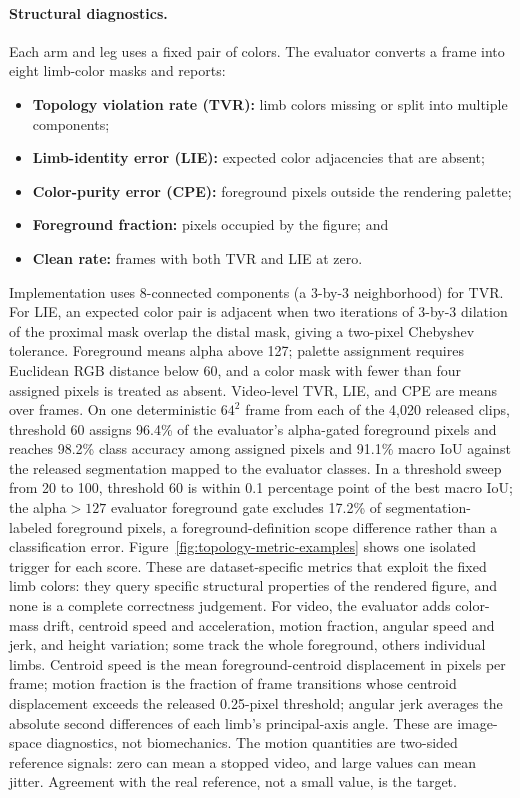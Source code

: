\documentclass[10pt,twocolumn,letterpaper]{article}
\begin{document}
\paragraph{Structural diagnostics.} Each arm and leg uses a fixed pair of colors. The evaluator converts a
frame into eight limb-color masks and reports:
\begin{itemize}\setlength\itemsep{0pt}
    \item \textbf{Topology violation rate (TVR):} limb colors missing or split into multiple components;
    \item \textbf{Limb-identity error (LIE):} expected color adjacencies that are absent;
    \item \textbf{Color-purity error (CPE):} foreground pixels outside the rendering palette;
    \item \textbf{Foreground fraction:} pixels occupied by the figure; and
    \item \textbf{Clean rate:} frames with both TVR and LIE at zero.
\end{itemize}
Implementation uses 8-connected components (a 3-by-3 neighborhood) for TVR. For LIE, an expected color
pair is adjacent when two iterations of 3-by-3 dilation of the proximal mask overlap the distal mask, giving
a two-pixel Chebyshev tolerance. Foreground means alpha above 127; palette assignment requires Euclidean RGB
distance below 60, and a color mask with fewer than four assigned pixels is treated as absent. Video-level
TVR, LIE, and CPE are means over frames.
On one deterministic $64^2$ frame from each of the 4,020 released clips, threshold 60 assigns 96.4\% of the
evaluator's alpha-gated foreground pixels and reaches 98.2\% class accuracy among assigned pixels and
91.1\% macro IoU against the released segmentation mapped to the evaluator classes. In a threshold sweep
from 20 to 100, threshold 60 is within 0.1 percentage point of the best macro IoU; the alpha${>}127$
evaluator foreground gate excludes 17.2\% of segmentation-labeled foreground pixels, a
foreground-definition scope difference rather than a classification error.
Figure~\ref{fig:topology-metric-examples} shows one isolated trigger for each score.
These are dataset-specific metrics that exploit the fixed limb colors: they query specific structural
properties of the rendered figure, and none is a complete correctness judgement. For video, the evaluator adds
color-mass drift, centroid speed and acceleration, motion fraction, angular speed and jerk, and height
variation; some track the whole foreground, others individual limbs. Centroid speed is the mean foreground-centroid displacement in
pixels per frame; motion fraction is the fraction of frame transitions whose centroid displacement exceeds the
released 0.25-pixel threshold; angular jerk averages the absolute second differences of each limb's
principal-axis angle. These are image-space diagnostics, not biomechanics. The motion quantities are
two-sided reference signals: zero can mean a stopped video, and large values can mean jitter. Agreement with
the real reference, not a small value, is the target.
\end{document}
